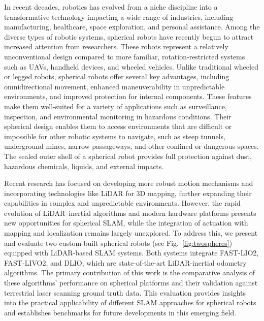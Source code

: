 \documentclass[english, bachelor, utf8]{base/thesis_telematics}
\begin{document}
In recent decades, robotics has evolved from a niche discipline into a transformative technology impacting a wide range of industries, including manufacturing, healthcare, space exploration, and personal assistance. 
Among the diverse types of robotic systems, spherical robots have recently begun to attract increased attention from researchers. These robots represent a relatively unconventional design compared to more familiar, rotation-restricted systems such as UAVs, handheld devices, and wheeled vehicles. 
Unlike traditional wheeled or legged robots, spherical robots offer several key advantages, including omnidirectional movement, enhanced maneuverability in unpredictable environments, and improved protection for internal components. 
These features make them well-suited for a variety of applications such as surveillance, inspection, and environmental monitoring in hazardous conditions. 
Their spherical design enables them to access environments that are difficult or impossible for other robotic systems to navigate, such as steep tunnels, underground mines, narrow passageways, and other confined or dangerous spaces.
The sealed outer shell of a spherical robot provides full protection against dust, hazardous chemicals, liquids, and external impacts. 

Recent research has focused on developing more robust motion mechanisms \cite{roboball,novelsphere,pendulum_sphere} and incorporating technologies like LiDAR for 3D mapping, further expanding their capabilities in complex and unpredictable environments\cite{Kalman_filter_sphere,DAEDALUS,sphere_Fabi_1}.
However, the rapid evolution of LiDAR–inertial algorithms and modern hardware platforms presents new opportunities for spherical SLAM, while the integration of actuation with mapping and localization remains largely unexplored.
To address this, we present and evaluate two custom-built spherical robots (see Fig.~\ref{fig:twospheres}) equipped with LiDAR-based SLAM systems.
Both systems integrate FAST-LIO2\cite{fastlio2}, FAST-LIVO2\cite{fastlivo2}, and DLIO\cite{dlio}, which are state-of-the-art LiDAR-inertial odometry algorithms.
The primary contribution of this work is the comparative analysis of these algorithms' performance on spherical platforms and their validation against terrestrial laser scanning ground truth data.
This evaluation provides insights into the practical applicability of different SLAM approaches for spherical robots and establishes benchmarks for future developments in this emerging field.
\end{document}
